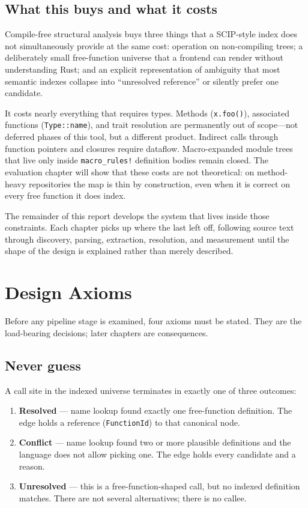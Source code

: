 \documentclass[11pt,a4paper,oneside]{report}
\begin{document}
\section{What this buys and what it costs}

Compile-free structural analysis buys three things that a SCIP-style index
does not simultaneously provide at the same cost: operation on non-compiling
trees; a deliberately small free-function universe that a frontend can render
without understanding Rust; and an explicit representation of ambiguity that
most semantic indexes collapse into ``unresolved reference'' or silently
prefer one candidate.

It costs nearly everything that requires types. Methods
(\texttt{x.foo()}), associated functions (\texttt{Type::name}), and trait
resolution are permanently out of scope---not deferred phases of this tool,
but a different product. Indirect calls through function pointers and
closures require dataflow. Macro-expanded module trees that live only inside
\texttt{macro\_rules!} definition bodies remain closed. The evaluation chapter
will show that these costs are not theoretical: on method-heavy repositories
the map is thin by construction, even when it is correct on every free
function it does index.

The remainder of this report develops the system that lives inside those
constraints. Each chapter picks up where the last left off, following source
text through discovery, parsing, extraction, resolution, and measurement
until the shape of the design is explained rather than merely described.

\chapter{Design Axioms}
\label{ch:axioms}

Before any pipeline stage is examined, four axioms must be stated. They are
the load-bearing decisions; later chapters are consequences.

\section{Never guess}

A call site in the indexed universe terminates in exactly one of three
outcomes:

\begin{enumerate}[nosep]
  \item \textbf{Resolved} --- name lookup found exactly one free-function
    definition. The edge holds a reference (\texttt{FunctionId}) to that
    canonical node.
  \item \textbf{Conflict} --- name lookup found two or more plausible
    definitions and the language does not allow picking one. The edge holds
    every candidate and a reason.
  \item \textbf{Unresolved} --- this is a free-function-shaped call, but no
    indexed definition matches. There are not several alternatives; there is
    no callee.
\end{enumerate}
\end{document}
